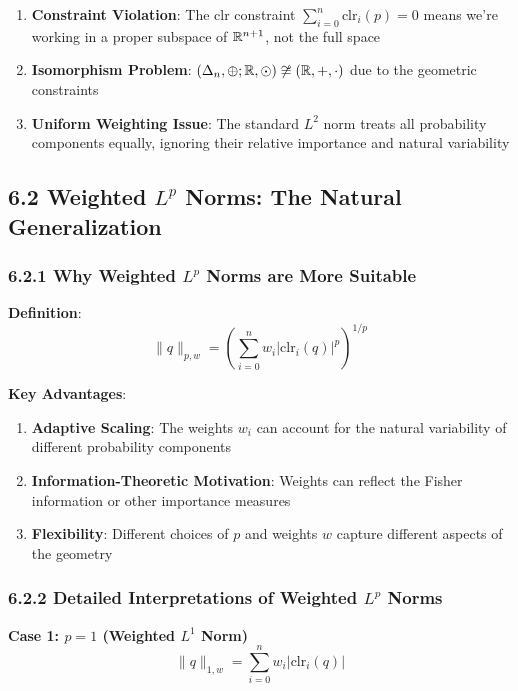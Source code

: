 \documentclass{amsart}
\let\originalmathbb\mathbb
\renewcommand{\mathbb}[1]{%
    \ifstrequal{#1}{1}{\mathbbm{#1}}{\originalmathbb{#1}}%
}
\theoremstyle{plain}
\theoremstyle{definition}
\theoremstyle{remark}
\begin{document}
\begin{enumerate}
	\item \textbf{Constraint Violation}: The clr constraint $\sum_{i=0}^n \text{clr}_i(p) = 0$ means we're working in a proper subspace of $\mathbb{R}^{n+1}$, not the full space
	\item \textbf{Isomorphism Problem}: $(\Delta_n,\oplus;\mathbb{R},\odot) \not\cong (\mathbb{R},+,\cdot)$ due to the geometric constraints
	\item \textbf{Uniform Weighting Issue}: The standard $L^2$ norm treats all probability components equally, ignoring their relative importance and natural variability
\end{enumerate}

\subsection{6.2 Weighted \texorpdfstring{$L^p$}{L^p} Norms: The Natural Generalization}

\subsubsection{6.2.1 Why Weighted \texorpdfstring{$L^p$}{L^p} Norms are More Suitable}

\textbf{Definition}:
\[
\|q\|_{p,w} = \left( \sum_{i=0}^n w_i |\text{clr}_i(q)|^p \right)^{1/p}
\]

\textbf{Key Advantages}:

\begin{enumerate}
	\item \textbf{Adaptive Scaling}: The weights $w_i$ can account for the natural variability of different probability components
	\item \textbf{Information-Theoretic Motivation}: Weights can reflect the Fisher information or other importance measures
	\item \textbf{Flexibility}: Different choices of $p$ and weights $w$ capture different aspects of the geometry
\end{enumerate}

\subsubsection{6.2.2 Detailed Interpretations of Weighted \texorpdfstring{$L^p$}{L^p} Norms}

\textbf{Case 1: $p = 1$ (Weighted $L^1$ Norm)}
\[
\|q\|_{1,w} = \sum_{i=0}^n w_i |\text{clr}_i(q)|
\]
\end{document}
